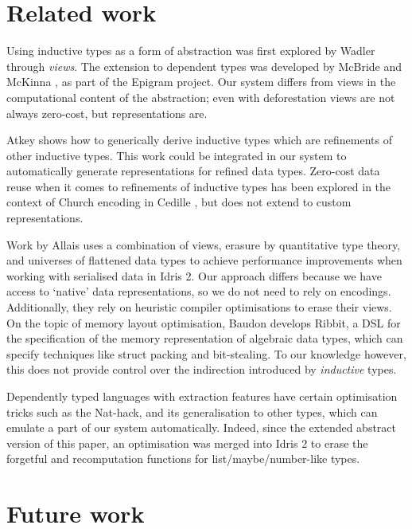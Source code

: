 \section{Related work}

Using inductive types as a form of abstraction was first explored by Wadler
\cite{Wadler1987-zp} through \emph{views}. The extension to dependent types
was developed by McBride and McKinna \cite{Mcbride2004-fd}, as part of the
Epigram project. Our system differs from views in the computational content
of the abstraction; even with deforestation \cite{Wadler1990-yo} views are not
always zero-cost, but representations are.

Atkey \cite{Atkey2011-ex} shows how to generically derive inductive types which
are refinements of other inductive types. This work could be integrated in our
system to automatically generate representations for refined data types.
Zero-cost data reuse when it comes to refinements of inductive types has been
explored in the context of Church encoding in Cedille \cite{Diehl2018-ba}, but
does not extend to custom representations.

Work by Allais \cite{Allais2023-pf,Allais2023-zq} uses a combination of views,
erasure by quantitative type theory, and universes of flattened data types to
achieve performance improvements when working with serialised data in Idris 2.
Our approach differs because we have access to `native' data representations, so
we do not need to rely on encodings. Additionally, they rely on heuristic compiler
optimisations to erase their views.
On the topic of memory layout optimisation, Baudon \cite{Baudon2023-cy} develops
Ribbit, a DSL for the specification of the memory representation of algebraic
data types, which can specify techniques like struct packing and bit-stealing.
To our knowledge however, this does not provide control over the indirection
introduced by \emph{inductive} types.

Dependently typed languages with extraction features have certain optimisation
tricks such as the Nat-hack, and its generalisation to other types, which can
emulate a part of our system automatically. Indeed, since the extended abstract
version of this paper, an optimisation was merged into Idris 2 to erase the
forgetful and recomputation functions for list/maybe/number-like types.

\section{Future work}

